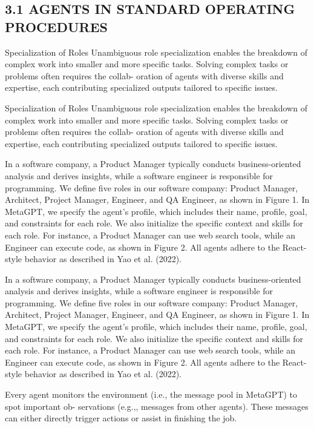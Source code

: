 \documentclass[12pt]{article}
\begin{document}
\subsection{3.1 AGENTS IN STANDARD OPERATING PROCEDURES}


Specialization of Roles Unambiguous role specialization enables the breakdown of complex work
into smaller and more specific tasks. Solving complex tasks or problems often requires the collab-
oration of agents with diverse skills and expertise, each contributing specialized outputs tailored to
specific issues.


Specialization of Roles Unambiguous role specialization enables the breakdown of complex work
into smaller and more specific tasks. Solving complex tasks or problems often requires the collab-
oration of agents with diverse skills and expertise, each contributing specialized outputs tailored to
specific issues.


In a software company, a Product Manager typically conducts business-oriented analysis and derives
insights, while a software engineer is responsible for programming. We define five roles in our
software company: Product Manager, Architect, Project Manager, Engineer, and QA Engineer, as
shown in Figure 1. In MetaGPT, we specify the agent’s profile, which includes their name, profile,
goal, and constraints for each role. We also initialize the specific context and skills for each role.
For instance, a Product Manager can use web search tools, while an Engineer can execute code, as
shown in Figure 2. All agents adhere to the React-style behavior as described in Yao et al. (2022).


In a software company, a Product Manager typically conducts business-oriented analysis and derives
insights, while a software engineer is responsible for programming. We define five roles in our
software company: Product Manager, Architect, Project Manager, Engineer, and QA Engineer, as
shown in Figure 1. In MetaGPT, we specify the agent’s profile, which includes their name, profile,
goal, and constraints for each role. We also initialize the specific context and skills for each role.
For instance, a Product Manager can use web search tools, while an Engineer can execute code, as
shown in Figure 2. All agents adhere to the React-style behavior as described in Yao et al. (2022).


Every agent monitors the environment (i.e., the message pool in MetaGPT) to spot important ob-
servations (e.g.,, messages from other agents). These messages can either directly trigger actions or
assist in finishing the job.
\end{document}
